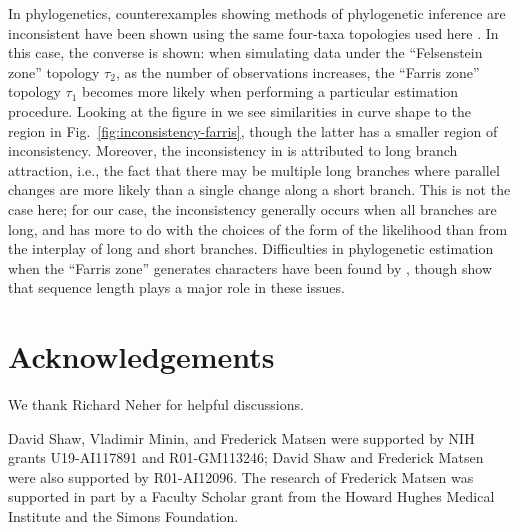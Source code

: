 \documentclass{article}
\newcommand{\beginsupplement}{%
        \setcounter{table}{0}
        \renewcommand{\thetable}{S\arabic{table}}%
        \setcounter{figure}{0}
        \renewcommand{\thefigure}{S\arabic{figure}}%
     }
\begin{document}
In phylogenetics, counterexamples showing methods of phylogenetic inference are inconsistent have been shown using the same four-taxa topologies used here \cite{Felsenstein1978-rr}.
In this case, the converse is shown: when simulating data under the ``Felsenstein zone'' topology $\tau_2$, as the number of observations increases, the ``Farris zone'' topology $\tau_1$ becomes more likely when performing a particular estimation procedure.
Looking at the figure in \cite{Felsenstein1978-rr} we see similarities in curve shape to the region in Fig.~\ref{fig:inconsistency-farris}, though the latter has a smaller region of inconsistency.
Moreover, the inconsistency in \cite{Felsenstein1978-rr} is attributed to long branch attraction, i.e., the fact that there may be multiple long branches where parallel changes are more likely than a single change along a short branch.
This is not the case here; for our case, the inconsistency generally occurs when all branches are long, and has more to do with the choices of the form of the likelihood than from the interplay of long and short branches.
Difficulties in phylogenetic estimation when the ``Farris zone'' generates characters have been found by \cite{Siddall1998-hq}, though \cite{Swofford2001-hr} show that sequence length plays a major role in these issues.



\section*{Acknowledgements}
We thank Richard Neher for helpful discussions.

David Shaw, Vladimir Minin, and Frederick Matsen were supported by NIH grants U19-AI117891 and R01-GM113246; David Shaw and Frederick Matsen were also supported by R01-AI12096.
The research of Frederick Matsen was supported in part by a Faculty Scholar grant from the Howard Hughes Medical Institute and the Simons Foundation.




\newpage
\beginsupplement


\end{document}
